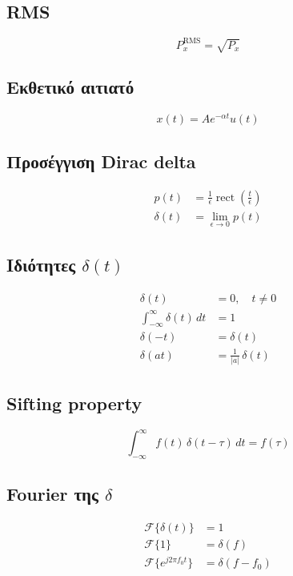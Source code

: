 \documentclass[11pt,a4paper]{article}
\newcommand{\F}{\mathcal{F}}
\newcommand{\rect}{\operatorname{rect}}
\begin{document}
\subsection{RMS}
\begin{equation}
P_x^{\mathrm{RMS}} = \sqrt{P_x}
\end{equation}

\subsection{Εκθετικό αιτιατό}
\begin{equation}
x(t) = A e^{-\alpha t} u(t)
\end{equation}

\subsection{Προσέγγιση Dirac delta}
\begin{align}
p(t) &= \frac{1}{\epsilon}\rect\!\left(\frac{t}{\epsilon}\right) \\
\delta(t) &= \lim_{\epsilon\to 0} p(t)
\end{align}

\subsection{Ιδιότητες $\delta(t)$}
\begin{align}
\delta(t) &= 0, \quad t \neq 0 \\
\int_{-\infty}^{\infty} \delta(t)\,dt &= 1 \\
\delta(-t) &= \delta(t) \\
\delta(at) &= \frac{1}{|a|}\,\delta(t)
\end{align}

\subsection{Sifting property}
\begin{equation}
\int_{-\infty}^{\infty} f(t)\,\delta(t-\tau)\,dt = f(\tau)
\end{equation}

\subsection{Fourier της $\delta$}
\begin{align}
\F\{\delta(t)\} &= 1 \\
\F\{1\} &= \delta(f) \\
\F\{e^{j2\pi f_0 t}\} &= \delta(f - f_0)
\end{align}
\end{document}

